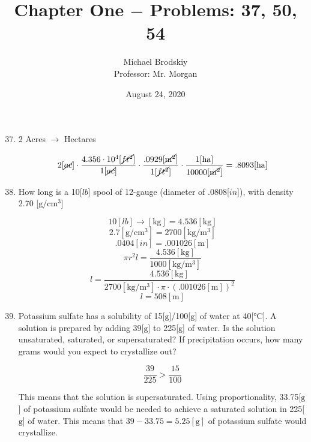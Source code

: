 \documentclass[12pt]{article}
\title{Chapter One $-$ Problems: 37, 50, 54}
\date{August 24, 2020}
\author{Michael Brodskiy\\ \small Professor: Mr. Morgan}
\begin{document}
\maketitle

\begin{enumerate}
    \setcounter{enumi}{36}

\item 2 Acres $\rightarrow$ Hectares

  $$2[\cancel{ac}] \cdot \frac{4.356\cdot10^4[\cancel{ft^2}]}{1[\cancel{ac}]}\cdot\frac{.0929[\cancel{\si{\meter\squared}}]}{1[\cancel{ft^2}]}\cdot\frac{1[\si{\hectare}]}{10000[\cancel{\si{\meter\squared}}]}=.8093[\si{\hectare}]$$

  \setcounter{enumi}{49}

\item How long is a 10[$lb$] spool of 12-gauge (diameter of .0808[$in$]), with density 2.70 [$\si{\gram\per\centi\meter\cubed}$]

  $$10[lb]\rightarrow [\si{\kilo\gram}]=4.536[\si{\kilo\gram}]$$
  $$2.7[\si{\gram\per\centi\meter\cubed}]=2700[\si{\kilo\gram\per\meter\cubed}]$$
  $$.0404[in]=.001026[\si{\meter}]$$
  $$\pi r^2 l= \frac{4.536[\si{\kilo\gram}]}{1000[\si{\kilo\gram\per\meter\cubed}]}$$
  $$l=\frac{4.536[\si{\kilo\gram}]}{2700[\si{\kilo\gram\per\meter\cubed}]\cdot\pi\cdot(.001026[\si{\meter}])^2}$$
    $$l=508[\si{\meter}]$$


	\setcounter{enumi}{53}

  \item Potassium sulfate has a solubility of 15[$\si{\gram}$]/100[$\si{\gram}$] of water at 40[$\si{\celsius}$]. A solution is prepared by adding 39[$\si{\gram}$] to 225[$\si{\gram}$] of water. Is the solution unsaturated, saturated, or supersaturated? If precipitation occurs, how many grams would you expect to crystallize out?

    $$\frac{39}{225} > \frac{15}{100}$$
    \begin{center} This means that the solution is supersaturated. Using proportionality, 33.75[$\si{\gram}$] of potassium sulfate would be needed to achieve a saturated solution in 225[$\si{\gram}$] of water. This means that $39-33.75=5.25[\si{\gram}]$ of potassium sulfate would crystallize.\end{center}


\end{enumerate}
\end{document}
